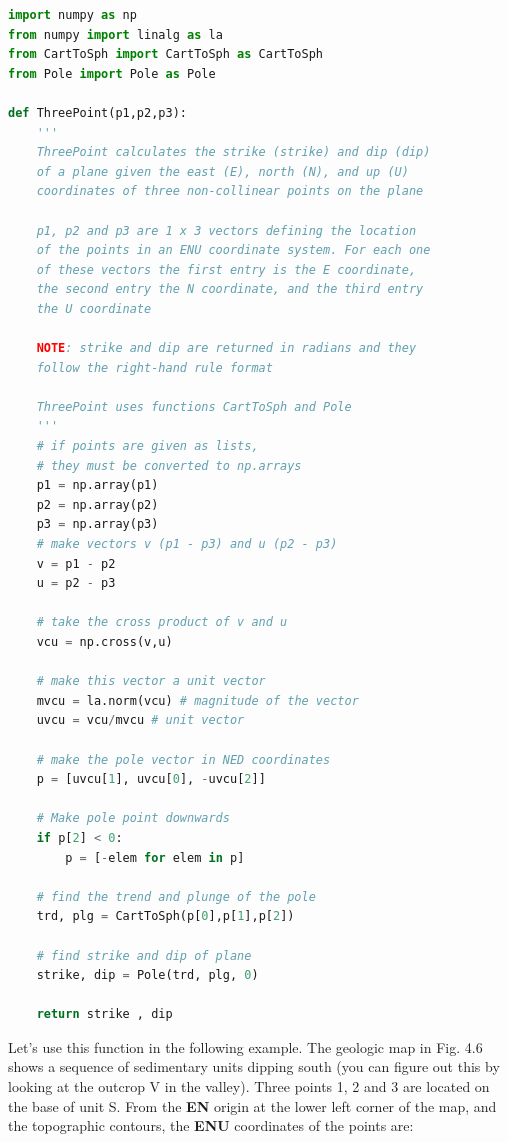 \documentclass[a4paper , 12pt]{book}
\begin{document}
\begin{lstlisting}[language=Python, frame=single]
import numpy as np
from numpy import linalg as la
from CartToSph import CartToSph as CartToSph
from Pole import Pole as Pole

def ThreePoint(p1,p2,p3):
    '''
    ThreePoint calculates the strike (strike) and dip (dip) 
    of a plane given the east (E), north (N), and up (U) 
    coordinates of three non-collinear points on the plane
    
    p1, p2 and p3 are 1 x 3 vectors defining the location 
    of the points in an ENU coordinate system. For each one 
    of these vectors the first entry is the E coordinate, 
    the second entry the N coordinate, and the third entry 
    the U coordinate

    NOTE: strike and dip are returned in radians and they 
    follow the right-hand rule format

    ThreePoint uses functions CartToSph and Pole
    '''
    # if points are given as lists, 
    # they must be converted to np.arrays
    p1 = np.array(p1)
    p2 = np.array(p2)
    p3 = np.array(p3)
    # make vectors v (p1 - p3) and u (p2 - p3)
    v = p1 - p2
    u = p2 - p3
    
    # take the cross product of v and u
    vcu = np.cross(v,u)
    
    # make this vector a unit vector
    mvcu = la.norm(vcu) # magnitude of the vector
    uvcu = vcu/mvcu # unit vector
    
    # make the pole vector in NED coordinates
    p = [uvcu[1], uvcu[0], -uvcu[2]]

    # Make pole point downwards
    if p[2] < 0:
        p = [-elem for elem in p]
        
    # find the trend and plunge of the pole
    trd, plg = CartToSph(p[0],p[1],p[2])
    
    # find strike and dip of plane
    strike, dip = Pole(trd, plg, 0)
    
    return strike , dip
\end{lstlisting}

Let's use this function in the following example. The geologic map in Fig. 4.6 shows a sequence of sedimentary units dipping south (you can figure out this by looking at the outcrop V in the valley). Three points 1, 2 and 3 are located on the base of unit S. From the \textbf{EN} origin at the lower left corner of the map, and the topographic contours, the \textbf{ENU} coordinates of the points are: 
\end{document}
